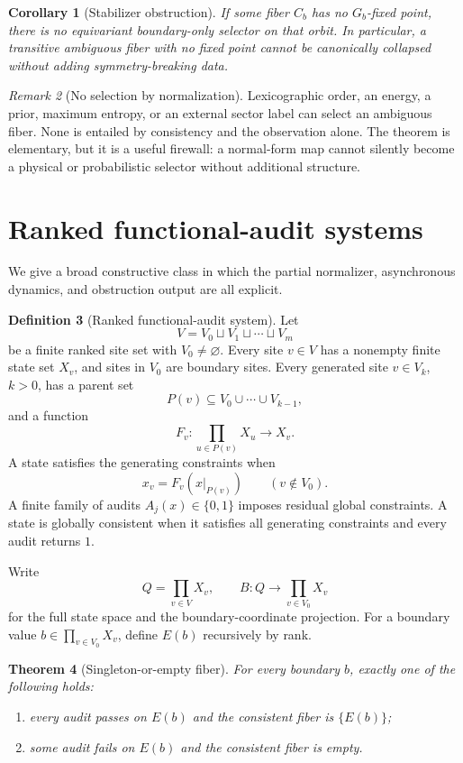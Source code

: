 \documentclass[11pt]{article}
\newtheorem{theorem}{Theorem}[section]
\newtheorem{corollary}[theorem]{Corollary}
\theoremstyle{definition}
\newtheorem{definition}[theorem]{Definition}
\theoremstyle{remark}
\newtheorem{remark}[theorem]{Remark}
\numberwithin{equation}{section}
\begin{document}
\begin{corollary}[Stabilizer obstruction]\label{thm:stabilizer}
If some fiber $C_b$ has no $G_b$-fixed point, there is no equivariant boundary-only selector on that orbit.  In particular, a transitive ambiguous fiber with no fixed point cannot be canonically collapsed without adding symmetry-breaking data.
\end{corollary}

\begin{remark}[No selection by normalization]
Lexicographic order, an energy, a prior, maximum entropy, or an external sector label can select an ambiguous fiber.  None is entailed by consistency and the observation alone.  The theorem is elementary, but it is a useful firewall: a normal-form map cannot silently become a physical or probabilistic selector without additional structure.
\end{remark}

\section{Ranked functional-audit systems}\label{sec:functional}

We give a broad constructive class in which the partial normalizer, asynchronous dynamics, and obstruction output are all explicit.

\begin{definition}[Ranked functional-audit system]
Let
\[
 V=V_0\sqcup V_1\sqcup\cdots\sqcup V_m
\]
be a finite ranked site set with $V_0\ne\varnothing$.  Every site $v\in V$
has a nonempty finite state set $X_v$, and sites in $V_0$ are boundary sites.
Every generated site $v\in V_k$, $k>0$, has a parent set
\[
 P(v)\subseteq V_0\cup\cdots\cup V_{k-1},
\]
and a function
\[
 F_v:\prod_{u\in P(v)}X_u\longrightarrow X_v.
\]
A state satisfies the generating constraints when
\[
 x_v=F_v(x|_{P(v)})\qquad(v\notin V_0).
\]
A finite family of audits $A_j(x)\in\{0,1\}$ imposes residual global constraints.  A state is globally consistent when it satisfies all generating constraints and every audit returns $1$.
\end{definition}

Write
\[
 Q=\prod_{v\in V}X_v,
 \qquad
 B:Q\longrightarrow\prod_{v\in V_0}X_v
\]
for the full state space and the boundary-coordinate projection.  For a
boundary value $b\in\prod_{v\in V_0}X_v$, define $E(b)$ recursively by
rank.

\begin{theorem}[Singleton-or-empty fiber]\label{thm:functional-fiber}
For every boundary $b$, exactly one of the following holds:
\begin{enumerate}[label=(\roman*)]
\item every audit passes on $E(b)$ and the consistent fiber is $\{E(b)\}$;
\item some audit fails on $E(b)$ and the consistent fiber is empty.
\end{enumerate}
\end{theorem}
\end{document}
